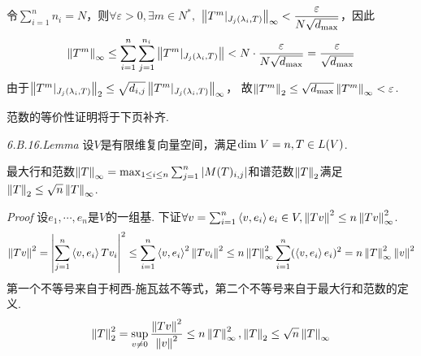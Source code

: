 令\(\sum_{i=1}^n n_i=N\)，则\(\forall \varepsilon>0,\exists m \in N^*,\)
\(\left\lVert T^m|_{J_j(\lambda_i,T)} \right\rVert_{\infty}<\dfrac{\varepsilon}{N \sqrt{d_{\max}}}\)，因此
    \begin{align*}
        \left\lVert T^m \right\rVert_{\infty} \leq \sum_{i=1}^n \sum_{j=1}^{n_i}\left\lVert T^m|_{J_j(\lambda_i,T)} \right\rVert<
        N \cdot \dfrac{\varepsilon}{N \sqrt{d_{\max}}}=\dfrac{\varepsilon}{\sqrt{d_{\max}}}
    \end{align*}
由于\(\left\lVert T^m|_{J_j(\lambda_i,T)} \right\rVert_2 \leq \sqrt{d_{i,j}}\left\lVert T^m|_{J_j(\lambda_i,T)} \right\rVert_{\infty}\)，
故\(\left\lVert T^m \right\rVert_2 \leq \sqrt{d_{\max}}\left\lVert T^m \right\rVert_{\infty}<\varepsilon\).

范数的等价性证明将于下页补齐.

\newpage

\textit{6.B.16.Lemma}
设\(V\)是有限维复向量空间，满足\(\mathrm{dim \;} V=n,T \in L(V)\).

最大行和范数\(\left\lVert T \right\rVert_{\infty}=\max_{1 \leq i \leq n} \sum_{j=1}^n \left\lvert M(T)_{i,j} \right\rvert\)和谱范数\(\left\lVert T \right\rVert_2\)满足
\(\left\lVert T \right\rVert_2 \leq \sqrt{n}\left\lVert T \right\rVert_{\infty}\).

\textit{Proof}
设\(e_1,\cdots,e_n\)是\(V\)的一组基.
下证\(\forall v=\sum_{i=1}^n \left\langle v,e_i \right\rangle e_i \in V,\left\lVert Tv \right\rVert^2 \leq n \left\lVert Tv \right\rVert_{\infty}^2\).
    \begin{align*}
        \left\lVert Tv \right\rVert^2=\left\lvert \sum_{j=1}^n \left\langle v,e_i \right\rangle Tv_i \right\rvert^2 \leq \sum_{i=1}^n \left\langle v,e_i \right\rangle^2 \left\lVert Tv_i \right\rVert^2 
        \leq n \left\lVert T \right\rVert_{\infty}^2 \sum_{i=1}^n (\left\langle v,e_i \right\rangle e_i)^2=n \left\lVert T \right\rVert_{\infty}^2 \left\lVert v \right\rVert^2
    \end{align*}
第一个不等号来自于柯西-施瓦兹不等式，第二个不等号来自于最大行和范数的定义.
    \begin{align*}
        \left\lVert T \right\rVert_2^2=\sup_{v \ne 0} \dfrac{\left\lVert Tv \right\rVert^2}{\left\lVert v \right\rVert^2} \leq n \left\lVert T \right\rVert_{\infty}^2,
        \left\lVert T \right\rVert_2 \leq \sqrt{n}\left\lVert T \right\rVert_{\infty}
    \end{align*}

